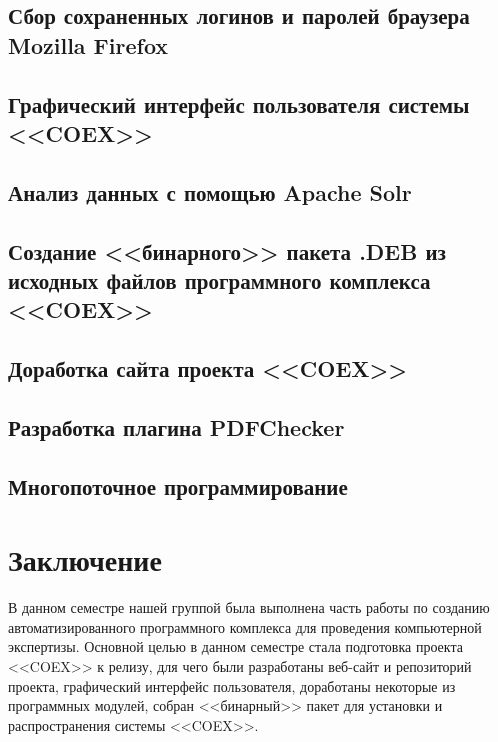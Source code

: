 \newpage
\subsection{Сбор сохраненных логинов и паролей браузера Mozilla Firefox}



\newpage
\subsection{Графический интерфейс пользователя системы <<COEX>>}

\newpage
\subsection{Анализ данных с помощью Apache Solr}

 
\newpage
\subsection {Создание <<бинарного>> пакета .DEB из исходных файлов программного комплекса <<COEX>>} 


\newpage 
\subsection{Доработка сайта проекта <<COEX>>}

\newpage
\subsection{Разработка плагина PDFChecker}


\newpage


\newpage
\subsection{Многопоточное программирование} 



\newpage
\section*{Заключение}
В данном семестре нашей группой была выполнена часть работы по созданию автоматизированного программного комплекса для проведения компьютерной экспертизы. Основной целью в данном семестре стала подготовка проекта <<COEX>> к релизу, для чего были разработаны веб-сайт и репозиторий проекта, графический интерфейс пользователя, доработаны некоторые из программных модулей, собран <<бинарный>> пакет для установки и распространения системы <<COEX>>. 

